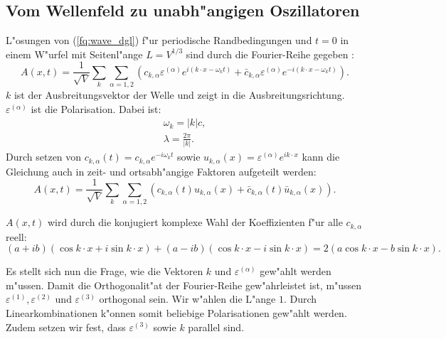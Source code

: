 \begin{refsection}
\section{Vom Wellenfeld zu unabh"angigen Oszillatoren}
L"osungen von (\ref{fq:wave_dgl}) f"ur periodische Randbedingungen und $t=0$ in einem W"urfel mit Seitenl"ange $L = V^{1/3}$ sind durch die Fourier-Reihe gegeben \cite{fq:em_wave_eq}:
\begin{equation} \label{fq:wave_eq}
A(x,t) = \frac{1}{\sqrt{V}} \sum_k \sum_{\alpha=1,2} \left(c_{k,\alpha} \varepsilon^{(\alpha)} e^{i (k \cdot x - \omega_k t)} + \bar{c}_{k,\alpha} \varepsilon^{(\alpha)} e^{-i(k \cdot x - \omega_k t)}\right).
\end{equation}
$k$ ist der Ausbreitungsvektor der Welle und zeigt in die Ausbreitungsrichtung. $\varepsilon^{(\alpha)}$ ist die Polarisation. Dabei ist:
\begin{align*}
\omega_k=|k|c, \\
\lambda = \frac{2 \pi}{|k|}.
\end{align*}
Durch setzen von $c_{k,\alpha}(t) = c_{k,\alpha} e^{-i \omega_k t}$ sowie $u_{k,\alpha}(x) = \varepsilon^{(\alpha)} e^{ik \cdot x}$ kann die Gleichung auch in zeit- und ortsabh"angige Faktoren aufgeteilt werden:
\begin{equation*}
A(x,t) = \frac{1}{\sqrt{V}} \sum_k \sum_{\alpha=1,2} \left(c_{k,\alpha}(t)u_{k,\alpha}(x) + \bar{c}_{k,\alpha}(t) \bar{u}_{k,\alpha}(x) \right).
\end{equation*}

$A(x,t)$ wird durch die konjugiert komplexe Wahl der Koeffizienten f"ur alle $c_{k,\alpha}$ reell:
\begin{equation*}
(a + ib)(\cos k \cdot x + i \sin k \cdot x ) + (a - ib)(\cos k \cdot x - i \sin k \cdot x ) = 2 ( a \cos k \cdot x - b \sin k \cdot x ).
\end{equation*}

Es stellt sich nun die Frage, wie die Vektoren $k$ und $\varepsilon^{(\alpha)}$ gew"ahlt werden m"ussen. Damit die Orthogonalit"at der Fourier-Reihe gew"ahrleistet ist, m"ussen $\varepsilon^{(1)}, \varepsilon^{(2)} \text{ und } \varepsilon^{(3)}$ orthogonal sein. Wir w"ahlen die L"ange $1$. Durch Linearkombinationen k"onnen somit beliebige Polarisationen gew"ahlt werden. Zudem setzen wir fest, dass $\varepsilon^{(3)}$ sowie $k$ parallel sind.


\end{refsection}
